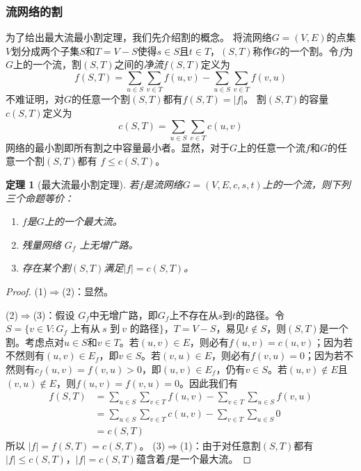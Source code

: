 \documentclass[fontset=ubuntu]{ctexbook}
\newtheorem{theorem}{定理}
\begin{document}
    \subsubsection*{流网络的割}
    为了给出最大流最小割定理，我们先介绍割的概念。
    将流网络$G=(V,E)$的点集$V$划分成两个子集$S$和$T=V-S$使得$s\in S$且$t\in T$，$(S,T)$称作$G$的一个割。令$f$为$G$上的一个流，割$(S,T)$之间的\emph{净流}$f(S,T)$定义为
    \[
    f(S,T) = \sum_{u\in S}\sum_{v\in T}f(u,v) - \sum_{u\in S}\sum_{v\in T}f(v,u)
    \]
    不难证明，对$G$的任意一个割$(S,T)$都有$f(S,T) = |f|$。
    割$(S,T)$的容量$c(S,T)$定义为
    \[
    c(S,T) = \sum_{u\in S}\sum_{v\in T}c(u,v)
    \]
    网络的最小割即所有割之中容量最小者。显然，对于$G$上的任意一个流$f$和$G$的任意一个割$(S,T)$都有 $f \le c(S,T)$。
    \begin{theorem}[最大流最小割定理]
        若$f$是流网络$G=(V,E,c,s,t)$上的一个流，则下列三个命题等价：
        \begin{enumerate}
            \item $f$是$G$上的一个最大流。
            \item 残量网络 $G_f$ 上无增广路。
            \item 存在某个割$(S,T)$满足$|f| = c(S,T)$。
        \end{enumerate}
    \end{theorem}
    \begin{proof}
        (1)$\Rightarrow$(2)：显然。

        (2)$\Rightarrow$(3)：假设 $G_f$中无增广路，即$G_f$上不存在从$s$到$t$的路径。令$S=\{v\in V\colon G_f\text{ 上有从}\ s\text{ 到}\ v\text{ 的路径}\}$，$T=V-S$，易见$t\notin S$，则$(S,T)$是一个割。考虑点对$u\in S$和$v\in T$。若$(u,v)\in E$，则必有$f(u,v)=c(u,v)$；因为若不然则有$(u,v)\in E_f$，即$v\in S$。若$(v,u)\in E$，则必有$f(v,u)=0$；因为若不然则有$c_f(u,v) = f(v,u) > 0$，即$(u,v)\in E_f$，仍有$v \in S$。若$(u,v)\notin E$且$(v,u)\notin E$，则$f(u,v)=f(v,u)=0$。因此我们有
        \begin{align*}
            f(S,T) &= \sum_{u\in S}\sum_{v\in T}f(u,v) - \sum_{v\in T}\sum_{u\in S}f(v,u)\\
            &= \sum_{u\in S}\sum_{v\in T}c(u,v) - \sum_{v\in T}\sum_{u\in S}0\\
            &= c(S, T)
        \end{align*}
        所以 $ |f| = f(S,T) = c(S, T)$。
        (3)$\Rightarrow$(1)：由于对任意割$(S,T)$都有$|f|\le c(S,T)$，$|f|=c(S,T)$蕴含着$f$是一个最大流。
    \end{proof}
\end{document}
